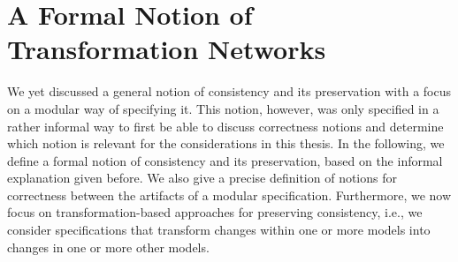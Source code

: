 \section{A Formal Notion of Transformation Networks}

We yet discussed a general notion of consistency and its preservation with a focus on a modular way of specifying it.
This notion, however, was only specified in a rather informal way to first be able to discuss correctness notions and determine which notion is relevant for the considerations in this thesis.
In the following, we define a formal notion of consistency and its preservation, based on the informal explanation given before.
We also give a precise definition of notions for correctness between the artifacts of a modular specification.
Furthermore, we now focus on transformation-based approaches for preserving consistency, i.e., we consider specifications that transform changes within one or more models into changes in one or more other models.

